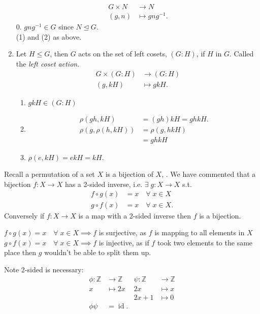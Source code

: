 \begin{example}
\begin{enumerate}
        \begin{align*}
            G \times N &\to N \\
            (g, n) &\mapsto gng^{-1}.
        \end{align*} 
        0.  $gng^{-1} \in G$ since $N \trianglelefteq G$. \\
        (1) and (2) as above.
        \item Let $H \leq G$, then $G$ acts on the set of left cosets, $(G : H)$, if $H$ in $G$.
        Called the \emph{left coset action}.
        \begin{align*}
            G \times (G : H) &\to (G : H) \\
            (g, kH) &\mapsto gkH.
        \end{align*} 
        \begin{enumerate} \addtocounter{enumii}{-1}
            \item $gkH \in (G : H)$
            \item
            \begin{align*}
                \rho(gh, kH) &= (gh)kH = gh kH. \\
                \rho(g, \rho(h, kH)) &= \rho(g, hkH) \\
                &= g h k H
            \end{align*} 
            \item $\rho(e, kH) = ek H = kH$.
        \end{enumerate} 
    \end{enumerate} 
\end{example} 

\begin{remark}
    Recall a permutation of a set $X$ is a bijection of $X$, .
    We have commented that a bijection $f : X \to X$ has a 2-sided inverse, i.e. $\exists \; g : X \to X$ s.t.
    \begin{align*}
        f \circ g (x) &= x \quad \forall \; x \in X \\
        g \circ f (x) &= x \quad \forall \; x \in X.
    \end{align*}
    Conversely if $f : X \to X$ is a map with a 2-sided inverse then $f$ is a bijection.

    $f \circ g(x) = x \quad \forall \; x \in X \implies f$ is surjective, as $f$ is mapping to all elements in $X$ \\
    $g \circ f(x) = x \quad \forall \; x \in X \implies f$ is injective, as if $f$ took two elements to the same place then $g$ wouldn't be able to split them up.

    Note 2-sided is necessary:
    \begin{align*}
        \phi : \mathbb{Z} &\to \mathbb{Z} & \psi : \mathbb{Z} &\to \mathbb{Z}\\
        x &\mapsto 2x & 2x & \mapsto x \\
        && 2x + 1 &\mapsto 0 \\
        \phi \psi &= \operatorname{id}. &&
    \end{align*} 
\end{remark} 

